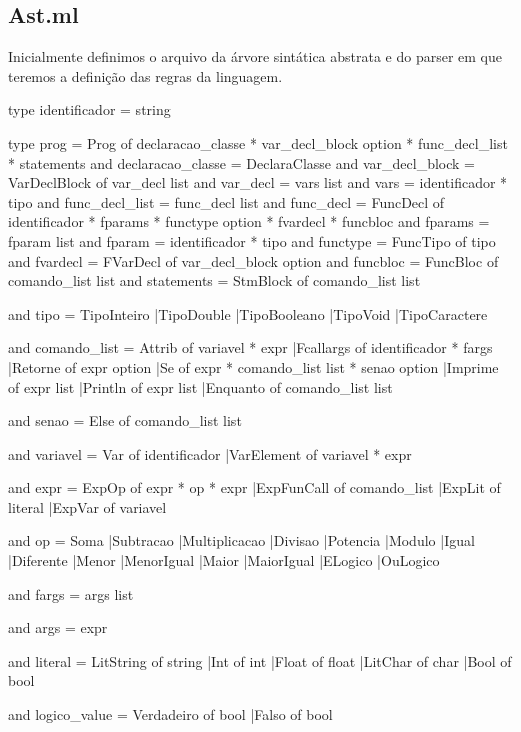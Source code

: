 \documentclass[12pt,a4paper,twoside]{report}
\begin{document}
\subsection{Ast.ml}
Inicialmente definimos o arquivo da árvore sintática abstrata e do parser em que teremos a definição das regras da linguagem.
\begin{terminal}
type identificador = string

type prog = Prog of declaracao_classe * var_decl_block option * func_decl_list * statements
and declaracao_classe = DeclaraClasse
and var_decl_block = VarDeclBlock of var_decl list
and var_decl = vars list
and vars = identificador * tipo
and func_decl_list = func_decl list
and func_decl = FuncDecl of identificador * fparams  * functype option * fvardecl * funcbloc
and fparams = fparam list
and fparam =  identificador * tipo
and functype = FuncTipo of tipo
and fvardecl = FVarDecl of var_decl_block option
and funcbloc = FuncBloc of comando_list list
and statements = StmBlock of comando_list list

and tipo = TipoInteiro
		  |TipoDouble
		  |TipoBooleano
		  |TipoVoid
		  |TipoCaractere

and comando_list  = Attrib of variavel * expr
		  	   |Fcallargs of identificador * fargs 
		  	   |Retorne of expr option
		  	   |Se of expr * comando_list list * senao option
		  	   |Imprime of expr list
		  	   |Println of expr list
		  	   |Enquanto of comando_list list

and senao = Else of comando_list list


and variavel = Var of identificador
			|VarElement of variavel * expr

and expr = ExpOp of expr * op * expr
		  |ExpFunCall of comando_list
		  |ExpLit of literal
		  |ExpVar of variavel

and op = Soma
		|Subtracao
		|Multiplicacao
		|Divisao
		|Potencia
		|Modulo
		|Igual
		|Diferente
		|Menor
		|MenorIgual
		|Maior
		|MaiorIgual
		|ELogico
		|OuLogico


and fargs = args list

and args = expr


and literal = LitString of string 
			 |Int of int
			 |Float of float
			 |LitChar of char
			 |Bool of bool

and logico_value = Verdadeiro of bool
				  |Falso of bool
			
\end{terminal}
\end{document}
